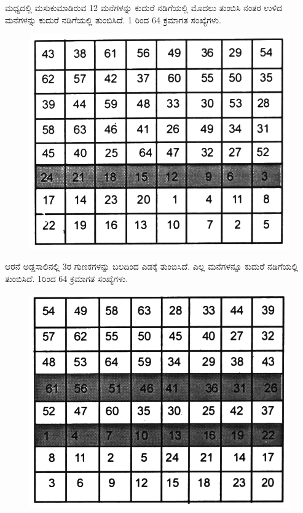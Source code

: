 ಮಧ್ಯದಲ್ಲಿ ಮಸುಕುಮಾಡಿರುವ 12 ಮನೆಗಳನ್ನು ಕುದುರೆ ನಡಿಗೆಯಲ್ಲಿ ಮೊದಲು ತುಂಬಿಸಿ ನಂತರ ಉಳಿದ ಮನೆಗಳನ್ನು ಕುದುರೆ ನಡಿಗೆಯಲ್ಲಿ ತುಂಬಿಸಿದೆ. 1 ರಿಂದ 64 ಕ್ರಮಾಗತ ಸಂಖ್ಯೆಗಳು.

\begin{figure}[H]
\includegraphics{src/figures/chap6/fig6.15.jpg}
\end{figure}
ಆರನೆ ಅಡ್ಡಸಾಲಿನಲ್ಲಿ 3ರ ಗುಣಕಗಳನ್ನು ಬಲದಿಂದ ಎಡಕ್ಕೆ ತುಂಬಿಸಿದೆ. ಎಲ್ಲ ಮನೆಗಳನ್ನೂ ಕುದುರೆ ನಡಿಗೆಯಲ್ಲಿ ತುಂಬಿಸಿದೆ. 1ರಿಂದ 64 ಕ್ರಮಾಗತ ಸಂಖ್ಯೆಗಳು.
\begin{figure}[H]
\includegraphics{src/figures/chap6/fig6.16.jpg}
\end{figure}
